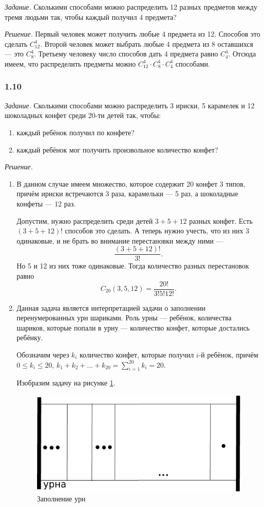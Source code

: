 \textit{Задание.} Сколькими способами можно распределить 12 разных предметов между тремя людьми так, чтобы каждый получил 4 предмета?

\textit{Решение.} Первый человек может получить любые 4 предмета из 12.
Способов это сделать $C_{12}^4$.
Второй человек может выбрать любые 4 предмета из 8 оставшихся --- это $C_8^4$.
Третьему человеку число способов дать 4 предмета равно $C_4^4$.
Отсюда имеем, что распределить предметы можно $C_{12}^4\cdot C_8^4\cdot C_4^4$ способами.

\subsubsection*{1.10}

\textit{Задание.} Сколькими способами можно распределить 3 ириски, 5 карамелек и 12 шоколадных конфет среди 20-ти детей так, чтобы:
\begin{enumerate}[label=\alph*)]
\item каждый ребёнок получил по конфете?
\item каждый ребёнок мог получить произвольное количество конфет?
\end{enumerate}

\textit{Решение.}
\begin{enumerate}[label=\alph*)]
\item В данном случае имеем множество, которое содержит 20 конфет 3 типов, причём ириски встречаются 3 раза, карамельки --- 5 раз, а шоколадные конфеты --- 12 раз.

Допустим, нужно распределить среди детей $3+5+12$ разных конфет.
Есть $\left(3+5+12\right)!$ способов это сделать.
А теперь нужно учесть, что из них 3 одинаковые, и не брать во внимание перестановки между ними ---
$$ \frac{ \left( 3 + 5 + 12 \right)!}{3!}.$$
Но 5 и 12 из них тоже одинаковые.
Тогда количество разных перестановок равно
$$ C_{20} \left( 3, 5, 12 \right) = \frac{20!}{3!5!12!}.$$

\item Данная задача является интерпретацией задачи о заполнении перенумерованных урн шариками.
Роль урны --- ребёнок, количества шариков, которые попали в урну --- количество конфет, которые достались ребёнку.

Обозначим через $k_i$ количество конфет, которые получил $i$-й ребёнок, причём $0 \leq k_i \leq 20, \, k_1 + k_2 + \dotsc + k_{20} = \sum \limits_{i=1}^{20} k_i = 20$.

Изобразим задачу на рисунке \ref{fig:110}.

\begin{figure}[h!]
  \centering
  \includegraphics[width=.4\textwidth]{./pictures/1_10.png}
  \caption{Заполнение урн}
  \label{fig:110}
\end{figure}
\end{enumerate}

